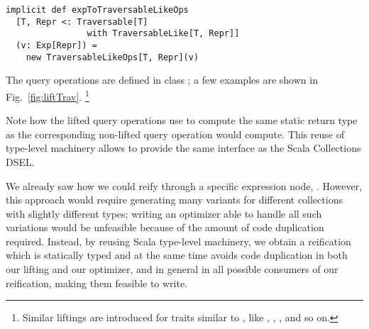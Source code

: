 \begin{lstlisting}
implicit def expToTraversableLikeOps
  [T, Repr <: Traversable[T]
                with TraversableLike[T, Repr]]
  (v: Exp[Repr]) =
    new TraversableLikeOps[T, Repr](v)
\end{lstlisting}

The query operations are defined in class ; a few examples are shown in Fig.~\ref{fig:liftTrav}.%
\footnote{Similar liftings are introduced for traits similar to , like , , , and so on.}

Note how the lifted query operations use  to compute the same static return type as the corresponding non-lifted query operation would compute. This reuse of type-level machinery allows {\LoS} to provide the same interface as the Scala Collections DSEL.

We already saw how we could reify  through a specific expression node, . However, this approach would require generating many variants for different collections with slightly different types; writing an optimizer able to handle all such variations would be unfeasible because of the amount of code duplication required.
Instead, by reusing Scala type-level machinery, we obtain a reification which is statically typed and at the same time avoids code duplication in both our lifting and our optimizer, and in general in all possible consumers of our reification, making them feasible to write.



